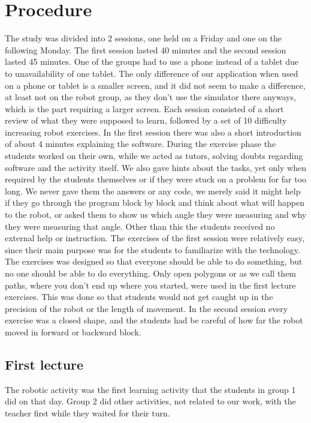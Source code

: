 \chapter{Procedure}
The study was divided into 2 sessions, one held on a Friday and one on the following Monday. The first session lasted 40 minutes and the second session lasted 45 minutes. 
One of the groups had to use a phone instead of a tablet due to unavailability of one tablet. 
The only difference of our application when used on a phone or tablet is a smaller screen, and it did not seem to make a difference, at least not on the robot group, as they don't use the simulator there anyways, which is the part requiring a larger screen. Each session consisted of a short review of what they were supposed to learn, followed by a set of 10 difficulty increasing robot exercises. In the first session there was also a short introduction of about 4 minutes explaining the software. During the exercise phase the students worked on their own, while we acted as tutors, solving doubts regarding software and the activity itself. We also gave hints about the tasks, yet only when required by the students themselves or if they were stuck on a problem for far too long. We never gave them the answers or any code, we merely said it might help if they go through the program block by block and think about what will happen to the robot, or asked them to show us which angle they were measuring and why they were measuring that angle. Other than this the students received no external help or instruction. The exercises of the first session were relatively easy, since their main purpose was for the students to familiarize with the technology. The exercises was designed so that everyone should be able to do something, but no one should be able to do everything. Only open polygons or as we call them paths, where you don't end up where you started, were used in the first lecture exercises. This was done so that students would not get caught up in the precision of the robot or the length of movement. In the second session every exercise was a closed shape, and the students had be careful of how far the robot moved in forward or backward block.  

\section{First lecture}
The robotic activity was the first learning activity that the students in group 1 did on that day. 
Group 2 did other activities, not related to our work, with the teacher first while they waited for their turn.

